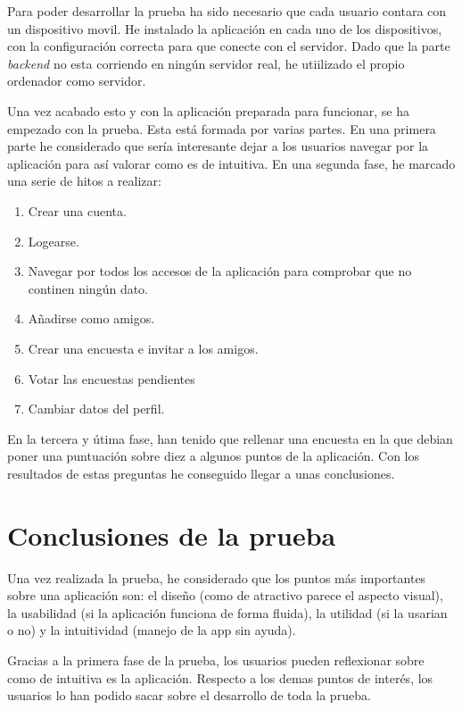 \documentclass[a4paper, 12pt]{book}
\begin{document}
Para poder desarrollar la prueba ha sido necesario que cada usuario contara con un dispositivo movil. He instalado la aplicaci\'on en cada uno de los dispositivos, con la configuraci\'on correcta para que conecte con el servidor. Dado que la parte \emph{backend} no esta corriendo en ning\'un servidor real, he utiilizado el propio ordenador como servidor.

Una vez acabado esto y con la aplicaci\'on preparada para funcionar, se ha empezado con la prueba. Esta est\'a formada por varias partes. En una primera parte he considerado que ser\'ia interesante dejar a los usuarios navegar por la aplicaci\'on para as\'i valorar como es de intuitiva. En una segunda fase, he marcado una serie de hitos a realizar:

\begin{enumerate}
\item Crear una cuenta.
\item Logearse.
\item Navegar por todos los accesos de la aplicaci\'on para comprobar que no continen ning\'un dato.
\item A\~nadirse como amigos.
\item Crear una encuesta e invitar a los amigos.
\item Votar las encuestas pendientes
\item Cambiar datos del perfil.
\end{enumerate}

En la tercera y \'utima fase, han tenido que rellenar una encuesta en la que debian poner una puntuaci\'on sobre diez a algunos puntos de la aplicaci\'on. Con los resultados de estas preguntas he conseguido llegar a unas conclusiones.

\section{Conclusiones de la prueba} 
\label{sec:conclusion_prueba}

Una vez realizada la prueba, he considerado que los puntos m\'as importantes sobre una aplicaci\'on son: el dise\~no (como de atractivo parece el aspecto visual), la usabilidad (si la aplicaci\'on funciona de forma fluida), la utilidad (si la usarian o no) y la intuitividad (manejo de la app sin ayuda).

Gracias a la primera fase de la prueba, los usuarios pueden reflexionar sobre como de intuitiva es la aplicaci\'on. Respecto a los demas puntos de inter\'es, los usuarios lo han podido sacar sobre el desarrollo de toda la prueba.
\end{document}
